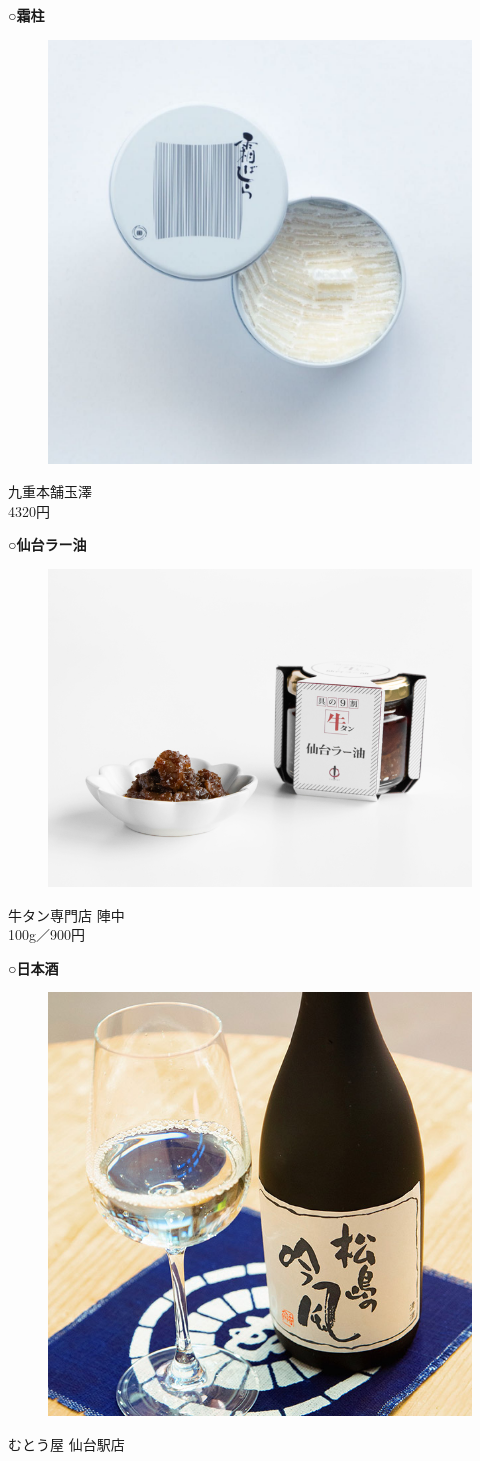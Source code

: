 \begin{minipage}{0.45\textwidth}

	\textbf{○霜柱}
	\begin{figure}[H]
		\centering
		\includegraphics[width=0.5\linewidth]{img/simobashira}
	\end{figure}
	\begin{center}
		{\scriptsize{九重本舗玉澤\\4320円}}
	\end{center}
	\textbf{○仙台ラー油}
	\begin{figure}[H]
		\centering
		\includegraphics[width=0.6\linewidth]{img/ra-yu}
	\end{figure}
	\begin{center}
		{\scriptsize{牛タン専門店 陣中\\100g／900円}}
	\end{center}
	
	\textbf{○日本酒}
	\begin{figure}[H]
		\centering
		\includegraphics[width=0.6\linewidth]{img/nihonshu}
	\end{figure}
	\begin{center}
		{\scriptsize{むとう屋 仙台駅店\\}}
	\end{center}
\end{minipage}
